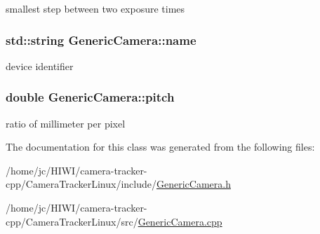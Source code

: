 smallest step between two exposure times 

\subsubsection[{\texorpdfstring{name}{name}}]{\setlength{\rightskip}{0pt plus 5cm}std\+::string Generic\+Camera\+::name\hspace{0.3cm}{\ttfamily [protected]}}\hypertarget{class_generic_camera_a12b86f8137447dd8af1864eb9bb062ee}{}\label{class_generic_camera_a12b86f8137447dd8af1864eb9bb062ee}


device identifier 

\subsubsection[{\texorpdfstring{pitch}{pitch}}]{\setlength{\rightskip}{0pt plus 5cm}double Generic\+Camera\+::pitch\hspace{0.3cm}{\ttfamily [protected]}}\hypertarget{class_generic_camera_a565f94ee10ad6333ca6e59a2fe8d32bb}{}\label{class_generic_camera_a565f94ee10ad6333ca6e59a2fe8d32bb}


ratio of millimeter per pixel 



The documentation for this class was generated from the following files\+:\begin{DoxyCompactItemize}
\item 
/home/jc/\+H\+I\+W\+I/camera-\/tracker-\/cpp/\+Camera\+Tracker\+Linux/include/\hyperlink{_generic_camera_8h}{Generic\+Camera.\+h}\item 
/home/jc/\+H\+I\+W\+I/camera-\/tracker-\/cpp/\+Camera\+Tracker\+Linux/src/\hyperlink{_generic_camera_8cpp}{Generic\+Camera.\+cpp}\end{DoxyCompactItemize}
